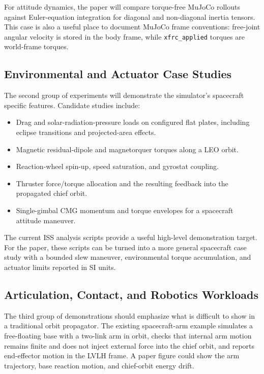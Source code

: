 For attitude dynamics, the paper will compare torque-free MuJoCo rollouts
against Euler-equation integration for diagonal and non-diagonal inertia
tensors. This case is also a useful place to document MuJoCo frame
conventions: free-joint angular velocity is stored in the body frame, while
\texttt{xfrc\_applied} torques are world-frame torques.

\subsection{Environmental and Actuator Case Studies}

The second group of experiments will demonstrate the simulator's spacecraft
specific features. Candidate studies include:

\begin{itemize}
  \item Drag and solar-radiation-pressure loads on configured flat plates,
  including eclipse transitions and projected-area effects.
  \item Magnetic residual-dipole and magnetorquer torques along a LEO orbit.
  \item Reaction-wheel spin-up, speed saturation, and gyrostat coupling.
  \item Thruster force/torque allocation and the resulting feedback into the
  propagated chief orbit.
  \item Single-gimbal CMG momentum and torque envelopes for a spacecraft
  attitude maneuver.
\end{itemize}

The current ISS analysis scripts provide a useful high-level demonstration
target. For the paper, these scripts can be turned into a more general
spacecraft case study with a bounded slew maneuver, environmental torque
accumulation, and actuator limits reported in SI units.

\subsection{Articulation, Contact, and Robotics Workloads}

The third group of demonstrations should emphasize what is difficult to show
in a traditional orbit propagator. The existing spacecraft-arm example
simulates a free-floating base with a two-link arm in orbit, checks that
internal arm motion remains finite and does not inject external force into
the chief orbit, and reports end-effector motion in the LVLH frame. A paper
figure could show the arm trajectory, base reaction motion, and chief-orbit
energy drift.

